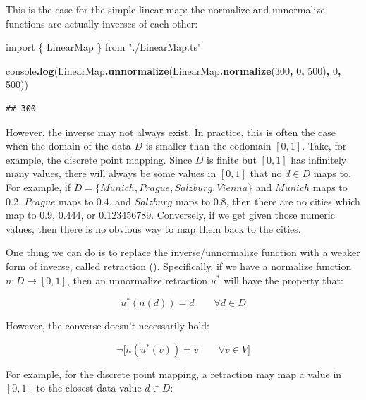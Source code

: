 \documentclass[
]{book}
\newenvironment{Shaded}{\begin{snugshade}}{\end{snugshade}}
\newcommand{\BuiltInTok}[1]{#1}
\newcommand{\DecValTok}[1]{\textcolor[rgb]{0.00,0.00,0.81}{#1}}
\newcommand{\FunctionTok}[1]{\textcolor[rgb]{0.13,0.29,0.53}{\textbf{#1}}}
\newcommand{\ImportTok}[1]{#1}
\newcommand{\NormalTok}[1]{#1}
\newcommand{\OperatorTok}[1]{\textcolor[rgb]{0.81,0.36,0.00}{\textbf{#1}}}
\newcommand{\StringTok}[1]{\textcolor[rgb]{0.31,0.60,0.02}{#1}}
\theoremstyle{definition}
\theoremstyle{definition}
\theoremstyle{definition}
\theoremstyle{definition}
\theoremstyle{remark}
\begin{document}
This is the case for the simple linear map: the normalize and unnormalize functions are actually inverses of each other:

\begin{Shaded}
\begin{Highlighting}[]
\ImportTok{import}\NormalTok{ \{ LinearMap \} }\ImportTok{from} \StringTok{"./LinearMap.ts"}

\BuiltInTok{console}\OperatorTok{.}\FunctionTok{log}\NormalTok{(LinearMap}\OperatorTok{.}\FunctionTok{unnormalize}\NormalTok{(LinearMap}\OperatorTok{.}\FunctionTok{normalize}\NormalTok{(}\DecValTok{300}\OperatorTok{,} \DecValTok{0}\OperatorTok{,} \DecValTok{500}\NormalTok{)}\OperatorTok{,} \DecValTok{0}\OperatorTok{,} \DecValTok{500}\NormalTok{))}
\end{Highlighting}
\end{Shaded}

\begin{verbatim}
## 300
\end{verbatim}

However, the inverse may not always exist. In practice, this is often the case when the domain of the data \(D\) is smaller than the codomain \([0, 1]\). Take, for example, the discrete point mapping. Since \(D\) is finite but \([0, 1]\) has infinitely many values, there will always be some values in \([0, 1]\) that no \(d \in D\) maps to. For example, if \(D = \{ Munich, Prague, Salzburg, Vienna \}\) and \(Munich\) maps to 0.2, \(Prague\) maps to \(0.4\), and \(Salzburg\) maps to \(0.8\), then there are no cities which map to 0.9, 0.444, or 0.123456789. Conversely, if we get given those numeric values, then there is no obvious way to map them back to the cities.

One thing we can do is to replace the inverse/unnormalize function with a weaker form of inverse, called retraction (). Specifically, if we have a normalize function \(n: D \to [0, 1]\), then an unnormalize retraction \(u^*\) will have the property that:

\[u^*(n(d)) = d \qquad \forall d \in D\]

However, the converse doesn't necessarily hold:

\[\neg \big[ n(u^*(v)) = v \qquad \forall v \in V \big]\]

For example, for the discrete point mapping, a retraction may map a value in \([0, 1]\) to the closest data value \(d \in D\):
\end{document}
